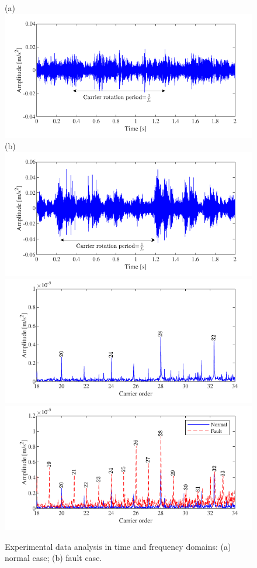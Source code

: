 \documentclass[a4paper,fleqn]{cas-sc}%
\begin{document}
\begin{figure}[pos=htbp]
    \centering
    (a) \includegraphics[scale=\myscale,valign=t]{Exp_Time_normal.pdf}
    (b) \includegraphics[scale=\myscale,valign=t]{Exp_Time_fault.pdf}\\
    \hspace*{1.5em}\includegraphics[scale=\myscale,valign=t]{Exp_normal_22.pdf}
    \hspace*{1.5em}\includegraphics[scale=\myscale,valign=t]{Exp_fault_22.pdf}
    \caption{Experimental data analysis in time and frequency domains: (a) normal case; (b) fault case.}
    \label{fig:exp_time_freq_comparison}
\end{figure}
\end{document}
